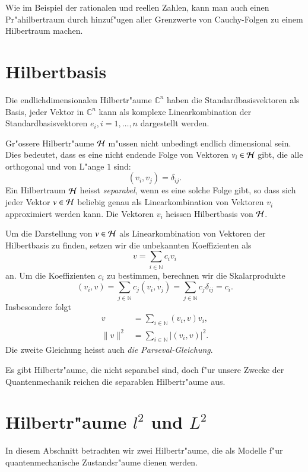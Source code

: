 Wie im Beispiel der rationalen und reellen Zahlen,
kann man auch einen Pr"ahilbertraum durch hinzuf"ugen aller Grenzwerte
von Cauchy-Folgen zu einem Hilbertraum machen.
%

\section{Hilbertbasis}
Die endlichdimensionalen Hilbertr"aume $\mathbb C^n$ haben die
Standardbasisvektoren als Basis, jeder Vektor in $\mathbb C^n$
kann als komplexe Linearkombination der Standardbasisvektoren
$e_i,i=1,\dots,n$ dargestellt werden.

Gr"ossere Hilbertr"aume $\cal H$ m"ussen nicht unbedingt endlich dimensional
sein. Dies bedeutet, dass es eine nicht endende Folge von Vektoren
$v_i\in\cal H$ gibt, die alle orthogonal und von L"ange $1$ sind:
\[
(v_i,v_j)=\delta_{ij}.
\]
Ein Hilbertraum $\cal H$ heisst {\em separabel}, wenn es eine solche Folge
%
%
gibt, so dass sich jeder Vektor $v\in\cal H$ beliebig genau als
Linearkombination von Vektoren $v_i$ approximiert werden kann.
Die Vektoren $v_i$ heissen Hilbertbasis von $\cal H$.
%

Um die Darstellung von $v\in\cal H$ als Linearkombination von Vektoren
der Hilbertbasis zu finden, setzen wir die unbekannten Koeffizienten
als 
\[
v=\sum_{i\in\mathbb N}c_iv_i
\]
an. Um die Koeffizienten $c_i$ zu bestimmen, berechnen wir die
Skalarprodukte
\[
(v_i,v)
=\sum_{j\in\mathbb N} c_j(v_i,v_j)=\sum_{j\in\mathbb N}c_j\delta_{ij}=c_i.
\]
Insbesondere folgt
\begin{align*}
v&=\sum_{i\in\mathbb N}(v_i,v) v_i,\\
\| v\|^2&=\sum_{i\in\mathbb N} |(v_i,v)|^2.
\end{align*}
Die zweite Gleichung heisst auch {\em die Parseval-Gleichung}.
%

Es gibt Hilbertr"aume, die nicht separabel sind, doch f"ur unsere Zwecke
der Quantenmechanik reichen die separablen Hilbertr"aume aus.

%
%
\section{Hilbertr"aume $l^2$ und $L^2$}
In diesem Abschnitt betrachten wir zwei Hilbertr"aume, die als 
Modelle f"ur quantenmechanische Zustandsr"aume dienen werden.

